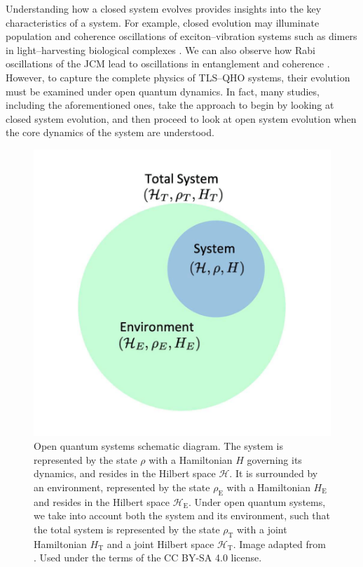 \documentclass[11pt]{article}
\begin{document}
\noindent Understanding how a closed system evolves provides insights into the key characteristics of a system. For example, closed evolution may illuminate population and coherence oscillations of exciton--vibration systems such as dimers in light--harvesting biological complexes \cite{ExVib2014-Alexandra}. We can also observe how Rabi oscillations of the JCM lead to oscillations in entanglement and coherence \cite{Entanglement2009-REE_VNapplied}. However, to capture the complete physics of TLS--QHO systems, their evolution must be examined under open quantum dynamics. In fact, many studies, including the aforementioned ones, take the approach to begin by looking at closed system evolution, and then proceed to look at open system evolution when the core dynamics of the system are understood.\\

\begin{figure}[h]
    \centering
    \includegraphics[scale=0.55]{Images/open_q_sys.png}
    \caption{Open quantum systems schematic diagram. The system is represented by the state $\rho$ with a Hamiltonian $H$ governing its dynamics, and resides in the Hilbert space $\mathcal{H}$. It is surrounded by an environment, represented by the state $\rho_{\scriptscriptstyle \text{E}}$ with a Hamiltonian $H_{\scriptscriptstyle \text{E}}$ and resides in the Hilbert space $\mathcal{H}_{\scriptscriptstyle \text{E}}$. Under open quantum systems, we take into account both the system and its environment, such that the total system is represented by the state $\rho_{\scriptscriptstyle \text{T}}$ with a joint Hamiltonian $H_{\scriptscriptstyle \text{T}}$ and a joint Hilbert space $\mathcal{H}_{\scriptscriptstyle \text{T}}$. Image adapted from \cite{Image2020-OQS}. Used under the terms of the CC BY-SA 4.0
        license.}
    \label{fig:img_OQS}
\end{figure}\\
\end{document}
